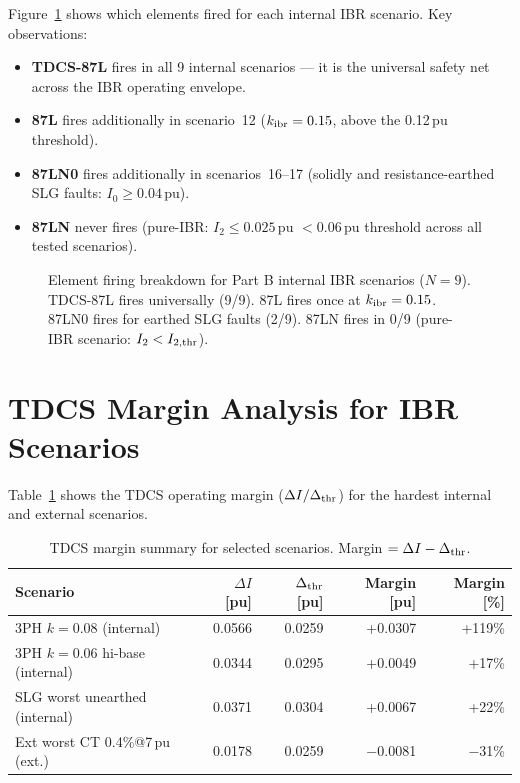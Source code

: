 \documentclass[11pt,a4paper]{article}
\begin{document}
Figure~\ref{fig:breakdown} shows which elements fired for each internal
IBR scenario.  Key observations:

\begin{itemize}
  \item \textbf{TDCS-87L} fires in all 9 internal scenarios — it is the
    universal safety net across the IBR operating envelope.
  \item \textbf{87L} fires additionally in scenario~12 ($k_{\rm ibr}=0.15$,
    above the 0.12\,pu threshold).
  \item \textbf{87LN0} fires additionally in scenarios~16--17 (solidly
    and resistance-earthed SLG faults: $I_0 \geq 0.04$\,pu).
  \item \textbf{87LN} never fires (pure-IBR: $I_2 \leq 0.025$\,pu
    $< 0.06$\,pu threshold across all tested scenarios).
\end{itemize}

\begin{figure}[h!]
  \centering
  
  \caption{Element firing breakdown for Part B internal IBR scenarios
           ($N=9$).  TDCS-87L fires universally (9/9).  87L fires once
           at $k_{\rm ibr}=0.15$.  87LN0 fires for earthed SLG faults (2/9).
           87LN fires in 0/9 (pure-IBR scenario: $I_2 < I_{2,\rm thr}$).}
  \label{fig:breakdown}
\end{figure}

\section{TDCS Margin Analysis for IBR Scenarios}

Table~\ref{tab:tdcs} shows the TDCS operating margin ($\Delta I / \Delta_{\rm thr}$)
for the hardest internal and external scenarios.

\begin{table}[h!]
\centering
\caption{TDCS margin summary for selected scenarios.
         Margin $= \Delta I - \Delta_{\rm thr}$.}
\label{tab:tdcs}
\begin{tabular}{lrrrr}
\toprule
Scenario & $\Delta I$ [pu] & $\Delta_{\rm thr}$ [pu] & Margin [pu] & Margin [\%] \\
\midrule
3PH $k=0.08$ (internal)         & 0.0566 & 0.0259 & +0.0307 & +119\% \\
3PH $k=0.06$ hi-base (internal) & 0.0344 & 0.0295 & +0.0049 & +17\%  \\
SLG worst unearthed (internal)  & 0.0371 & 0.0304 & +0.0067 & +22\%  \\
Ext worst CT 0.4\%@7\,pu (ext.) & 0.0178 & 0.0259 & $-$0.0081 & $-$31\% \\
\bottomrule
\end{tabular}
\end{table}
\end{document}
